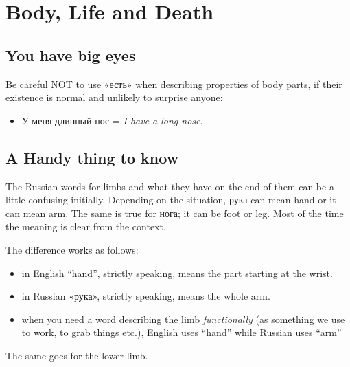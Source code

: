 \chapter{Body, Life and Death}\label{body-life-and-death}

\section{You have big eyes}\label{you-have-big-eyes}

Be careful NOT to use «есть» when describing properties of body parts,
if their existence is normal and unlikely to surprise anyone:

\begin{itemize}
\tightlist
\item
  У меня длинный нос = \emph{I have a long nose}.
\end{itemize}

\section{A Handy thing to know}\label{a-handy-thing-to-know}

The Russian words for limbs and what they have on the end of them can be
a little confusing initially. Depending on the situation, рука can mean
hand or it can mean arm. The same is true for нога; it can be foot or
leg. Most of the time the meaning is clear from the context.

The difference works as follows:

\begin{itemize}
\tightlist
\item
  in English ``hand'', strictly speaking, means the part starting at the
  wrist.
\item
  in Russian «рука», strictly speaking, means the whole arm.
\item
  when you need a word describing the limb \emph{functionally} (as
  something we use to work, to grab things etc.), English uses ``hand''
  while Russian uses ``arm''
\end{itemize}

The same goes for the lower limb.
